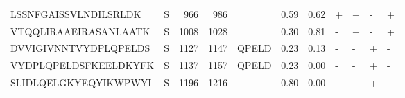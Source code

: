 \begin{tabular}{llrrlrrllll}
LSSNFGAISSVLNDILSRLDK &       S &    966 &   986 &                     &            0.59 &             0.62 &      + &       + &      - &       + \\
VTQQLIRAAEIRASANLAATK &       S &   1008 &  1028 &                     &            0.30 &             0.81 &      - &       + &      - &       + \\
DVVIGIVNNTVYDPLQPELDS &       S &   1127 &  1147 &               QPELD &            0.23 &             0.13 &      - &       - &      + &       - \\
VYDPLQPELDSFKEELDKYFK &       S &   1137 &  1157 &               QPELD &            0.23 &             0.00 &      - &       - &      + &       - \\
SLIDLQELGKYEQYIKWPWYI &       S &   1196 &  1216 &                     &            0.80 &             0.00 &      - &       - &      + &       - \\
\bottomrule
\end{tabular}
